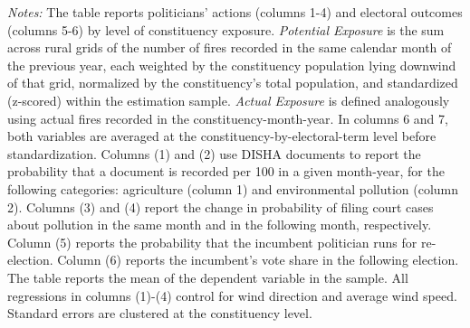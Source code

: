 \documentclass[12pt]{article}
\begin{document}
\begin{table}[htbp!] 
\caption{Pollution Exposure, Politicians' Actions, and Electoral Consequences, rural grid $\times$ Count $\times$ Downwind Pop }\label{tab:mechanism}
        \resizebox{\linewidth}{!}{
        
        }
    \begin{minipage}{\textwidth}
        {\footnotesize \textit{Notes:} The table reports politicians' actions (columns 1-4) and electoral outcomes (columns 5-6) by level of constituency exposure.
        \textit{Potential Exposure} is the sum across rural grids of the number of fires  recorded in the same calendar month of the previous year, each weighted by the  constituency population lying downwind of that grid, normalized by the  constituency's total population, and standardized (z-scored) within the  estimation sample.
       \textit{Actual Exposure} is defined analogously using actual fires recorded in the   constituency-month-year. In columns 6 and 7, both variables are averaged at  the constituency-by-electoral-term level before standardization.
        Columns (1) and (2) use DISHA documents to report the probability that a document is recorded per 100 in a given month-year, for the following categories: agriculture (column 1) and environmental pollution (column 2). Columns (3) and (4) report the change in probability of filing court cases about pollution in the same month and in the following month, respectively. Column (5) reports the probability that the incumbent politician runs for re-election. Column (6) reports the incumbent's vote share in the following election.
        The table reports the mean of the dependent variable in the sample. All regressions in columns (1)-(4) control for wind direction and average wind speed. Standard errors are clustered at the constituency level.
        }
    \end{minipage}
\end{table}
\end{document}
